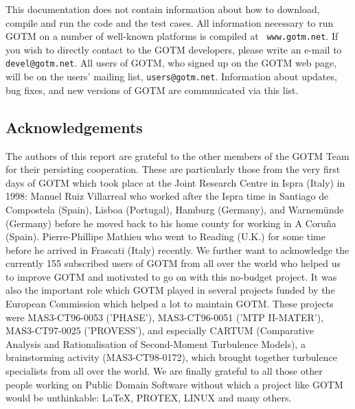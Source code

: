 This documentation does not contain information about how to download,
compile and run the code and the test cases. All information necessary
to run GOTM on a number of well-known platforms is compiled at {\tt
www.gotm.net}. If you wish to directly contact to the GOTM developers,
please write an e-mail to {\tt devel@gotm.net}. All users of GOTM,
who signed up on the GOTM web page, will be on the users' mailing
list, {\tt users@gotm.net}. Information about updates, bug fixes, and
new versions of GOTM are communicated via this list.

\subsection{Acknowledgements}

The authors of this report are grateful to the other members of the
GOTM Team for their persisting cooperation. These are particularly
those from the very first days of GOTM which took place at the Joint
Research Centre in Ispra (Italy) in 1998: Manuel Ruiz Villarreal who
worked after the Ispra time in Santiago de Compostela (Spain), Lisboa
(Portugal), Hamburg (Germany), and Warnem\"unde (Germany) before he
moved back to his home county for working in A Coru\~na
(Spain). Pierre-Phillipe Mathieu who went to Reading (U.K.) for some
time before he arrived in Frascati (Italy) recently.  We further want
to acknowledge the currently 155 subscribed users of GOTM from all
over the world who helped us to improve GOTM and motivated to go on
with this no-budget project.  It was also the important role which
GOTM played in several projects funded by the European Commission
which helped a lot to maintain GOTM.  These projects were
MAS3-CT96-0053 ('PHASE'), MAS3-CT96-0051 ('MTP II-MATER'),
MAS3-CT97-0025 ('PROVESS'), and especially CARTUM (Comparative
Analysis and Rationalisation of Second-Moment Turbulence Models), a
brainstorming activity (MAS3-CT98-0172), which brought together
turbulence specialists from all over the world.  We are finally
grateful to all those other people working on Public Domain Software
without which a project like GOTM would be unthinkable:
\LaTeX, PROTEX, LINUX and many others. 
